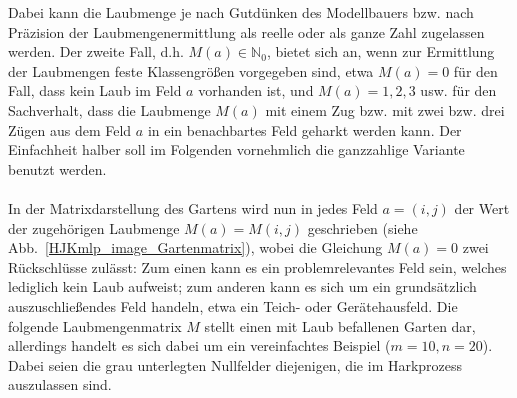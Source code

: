 \documentclass[fontsize=12pt,doubleside,openany,listof=totoc,listof=flat,listof=nochaptergap,numbers=noenddot]{scrbook}
\theoremstyle{style}
\begin{document}
\noindent Dabei kann die Laubmenge je nach Gutdünken des Modellbauers bzw. nach Präzision der 
Laubmengenermittlung als reelle oder als ganze Zahl zugelassen werden. Der zweite 
Fall, d.h. $M(a) \in \mathbb{N}_0$, bietet sich an, wenn zur Ermittlung der
Laubmengen feste Klassengrößen vorgegeben sind, etwa $M(a)=0$ für den Fall, dass
kein Laub im Feld $a$ vorhanden ist, und $M(a)=1, 2, 3$ usw. für den
Sachverhalt, dass die Laubmenge $M(a)$ mit einem Zug bzw. mit zwei bzw. drei
Zügen aus dem Feld $a$ in ein benachbartes Feld geharkt werden kann. Der Einfachheit halber 
soll im Folgenden vornehmlich die ganzzahlige Variante benutzt werden.\\
\\
In der Matrixdarstellung des Gartens wird nun in jedes Feld $a=(i,j)$ der Wert
der zugehörigen Laubmenge $M(a)=M(i,j)$ geschrieben (siehe
Abb.~\ref{HJKmlp_image_Gartenmatrix}), wobei die Gleichung $M(a)=0$ zwei Rückschlüsse
zulässt: Zum einen kann es ein problemrelevantes Feld sein, welches lediglich kein Laub aufweist; 
zum anderen kann es sich um ein grundsätzlich auszuschließendes Feld handeln, etwa ein Teich- oder Gerätehausfeld. Die folgende Laubmengenmatrix $M$ stellt einen mit Laub befallenen Garten dar, allerdings handelt es sich dabei um ein vereinfachtes Beispiel ($m=10, n=20$). Dabei seien die grau unterlegten Nullfelder diejenigen, die im Harkprozess auszulassen sind.
\end{document}
